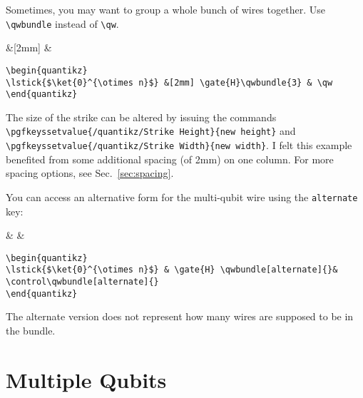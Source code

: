 \documentclass[aps,pra,10pt,nofootinbib]{revtex4}
\begin{document}
Sometimes, you may want to group a whole bunch of wires together. Use \verb!\qwbundle! instead of \verb!\qw!.
\begin{Code}
\begin{center}
\begin{quantikz}
 &[2mm]  &  \qw
\end{quantikz}
\end{center}
\tcblower
\begin{lstlisting}
\begin{quantikz}
\lstick{$\ket{0}^{\otimes n}$} &[2mm] \gate{H}\qwbundle{3} & \qw
\end{quantikz}
\end{lstlisting}
\end{Code}
\noindent The size of the strike can be altered by issuing the commands \verb!\pgfkeyssetvalue{/quantikz/Strike Height}{new height}! and \verb!\pgfkeyssetvalue{/quantikz/Strike Width}{new width}!. I felt this example benefited from some additional spacing (of 2mm) on one column. For more spacing options, see Sec.\ \ref{sec:spacing}.

You can access an alternative form for the multi-qubit wire using the \verb!alternate! key:
\begin{Code}
\begin{center}
\begin{quantikz}
 &  \qwbundle[alternate]{}&  \qwbundle[alternate]{} 
\end{quantikz}
\end{center}
\tcblower
\begin{lstlisting}
\begin{quantikz}
\lstick{$\ket{0}^{\otimes n}$} & \gate{H} \qwbundle[alternate]{}& \control\qwbundle[alternate]{} 
\end{quantikz}
\end{lstlisting}
\end{Code}
\noindent The alternate version does not represent how many wires are supposed to be in the bundle.


\section{Multiple Qubits}
\end{document}
